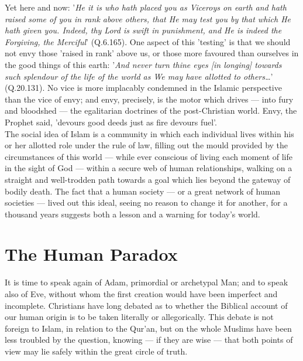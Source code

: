 \documentclass[11pt, b5paper, twoside]{book}
\begin{document}
Yet here and now: '\emph{He it is who hath placed you as Viceroys on earth and hath raised some of you in 
rank above others, that He may test you by that which He hath given you. Indeed, thy Lord is swift in 
punishment, and He is indeed the Forgiving, the Merciful}' (Q.6.165). One aspect of this 'testing' is 
that we should not envy those 'raised in rank' above us, or those more favoured than ourselves in the 
good things of this earth: '\emph{And never turn thine eyes [in longing] towards such splendour of the life 
of the world as We may have allotted to others\ldots{}}' (Q.20.131). No vice is more implacably condemned 
in the Islamic perspective than the vice of envy; and envy, precisely, is the motor which drives --- 
into fury and bloodshed --- the egalitarian doctrines of the post-Christian world. Envy, the Prophet 
said, 'devours good deeds just as fire devours fuel'. \\

The social idea of Islam is a community in which each individual lives within his or her allotted 
role under the rule of law, filling out the mould provided by the circumstances of this world --- while 
ever conscious of living each moment of life in the sight of God --- within a secure web of human 
relationships, walking on a straight and well-trodden path towards a goal which lies beyond the 
gateway of bodily death. The fact that a human society --- or a great network of human societies --- 
lived out this ideal, seeing no reason to change it for another, for a thousand years suggests both a 
lesson and a warning for today's world. \\


\chapter{The Human Paradox}


It is time to speak again of Adam, primordial or archetypal Man; and to speak also of Eve, without 
whom the first creation would have been imperfect and incomplete. Christians have long debated as to 
whether the Biblical account of our human origin is to be taken literally or allegorically. This 
debate is not foreign to Islam, in relation to the Qur'an, but on the whole Muslims have been less 
troubled by the question, knowing --- if they are wise --- that both points of view may lie safely within 
the great circle of truth. \\
\end{document}
